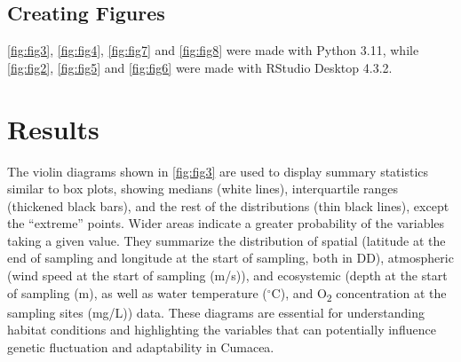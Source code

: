 \subsection{Creating Figures}\label{Figures}
\autoref{fig:fig3}, \autoref{fig:fig4}, \autoref{fig:fig7} and \autoref{fig:fig8} were made with Python 3.11, while \autoref{fig:fig2}, \autoref{fig:fig5} and \autoref{fig:fig6} were made with RStudio Desktop 4.3.2.

\section{Results}\label{results}
The violin diagrams shown in \autoref{fig:fig3} are used to display summary statistics similar to box plots, showing medians (white lines), interquartile ranges (thickened black bars), and the rest of the distributions (thin black lines), except the ``extreme'' points. Wider areas indicate a greater probability of the variables taking a given value. They summarize the distribution of spatial (latitude at the end of sampling and longitude at the start of sampling, both in DD), atmospheric (wind speed at the start of sampling (m/s)), and ecosystemic (depth at the start of sampling (m), as well as water temperature ($^\circ$C), and O\textsubscript{2} concentration at the sampling sites (mg/L)) data. These diagrams are essential for understanding habitat conditions and highlighting the variables that can potentially influence genetic fluctuation and adaptability in Cumacea. 

